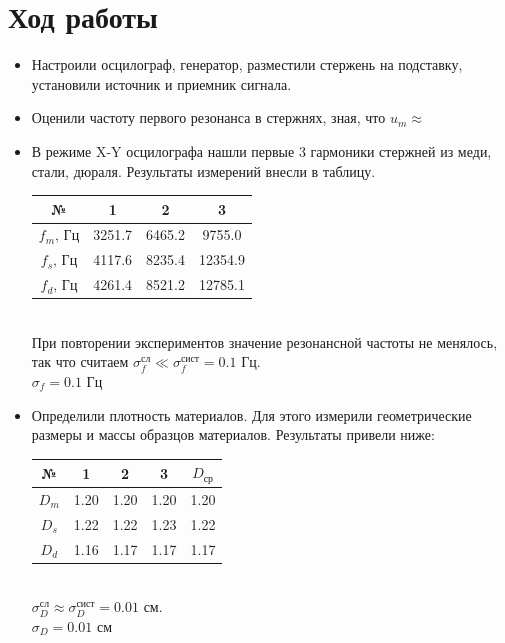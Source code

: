 \documentclass[a4paper, 12pt]{article}
\begin{document}
\section*{Ход работы}
\begin{itemize}
    \item Настроили осцилограф, генератор, разместили стержень на подставку, установили источник и приемник сигнала.
    \item Оценили частоту первого резонанса в стержнях, зная, что $u_m\approx$
    \item  В режиме X-Y осцилографа нашли первые 3 гармоники стержней из меди, стали, дюраля. Результаты измерений внесли в таблицу.
    \begin{table}[h]
        \centering
        \begin{tabular}{|c|ccc|}
        \hline
        №& 1& 2& 3\\ \hline
        $f_m\text{, Гц}$& 3251.7&  6465.2& 9755.0\\ 
        $f_s\text{, Гц}$& 4117.6& 8235.4& 12354.9\\
        $f_d\text{, Гц}$& 4261.4& 8521.2& 12785.1\\ \hline
        \end{tabular}
    \end{table}\\
    При повторении экспериментов значение резонансной частоты не менялось, так что считаем $\sigma^{\text{сл}}_f \ll\sigma^{\text{сист}}_f=0.1\text{ Гц}$.\\
    $\sigma_f=0.1\text{ Гц}$
    \item Определили плотность материалов. Для этого измерили геометрические размеры и массы образцов материалов. Результаты привели ниже:
    \begin{table}[h]
        \centering
        \begin{tabular}{|c|cccc|}
        \hline
        №& 1& 2& 3& $D_{ср}$\\
        \hline
        $D_m$& 1.20& 1.20& 1.20& 1.20\\
        $D_s$& 1.22& 1.22& 1.23& 1.22\\
        $D_d$& 1.16& 1.17& 1.17& 1.17\\
        \hline
        \end{tabular}
    \end{table}\\
    $\sigma^{\text{сл}}_D \approx\sigma^{\text{сист}}_D=0.01\text{ см}$.\\
    $\sigma_D=0.01\text{ см}$
    \begin{table}[h!]

\end{table}
\end{itemize}
\end{document}
